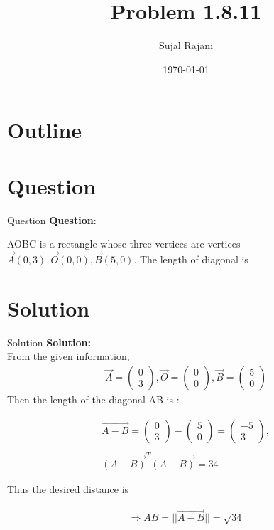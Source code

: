 \documentclass{beamer}
\title{Problem 1.8.11}
\author{Sujal Rajani}
\date{\today}
\theoremstyle{remark}
\newcommand{\myvec}[1]{\ensuremath{\begin{pmatrix}#1\end{pmatrix}}}
\numberwithin{equation}{section}
\begin{document}
\begin{frame}
\titlepage
\end{frame}

\section*{Outline}
\begin{frame}
\tableofcontents
\end{frame}
\section{Question}
\begin{frame}{Question}
\textbf{Question}:


\noindent AOBC is a rectangle whose three vertices are vertices $\vec{A}(0,3),\vec{O}(0,0),\vec{B}(5,0)$. The 
length of diagonal is \underline{\hspace{2cm}}.   

\end{frame}

    

\section{Solution}
\begin{frame}{Solution}
\textbf{Solution:} 
\\
From the given information,
\begin{align}
		\vec{A} = \myvec{0\\3},\vec{O} = \myvec{0\\0},\vec{B} = \myvec{5\\0} 
\end{align}
Then the length of the diagonal AB is :

\begin{align}
    \vec{A-B}=\myvec{0\\3}-\myvec{5\\0}=\myvec{-5\\3},
    \\
    \\
    \vec{(A-B)}^T\vec{(A-B)}=34
    \end{align}
    
    Thus the desired distance is
    
    \begin{align}
     \Rightarrow AB=||\vec{A-B}||=\sqrt{34}	 
    \end{align}
    \end{frame}
\end{document}
